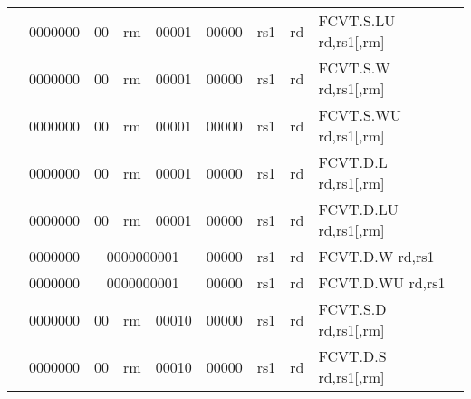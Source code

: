 \begin{table}[p]
\begin{small}
\begin{center}
\begin{tabular}{rcccccccccl}
&
\multicolumn{1}{|c|}{0000000} &
\multicolumn{1}{c|}{00} &
\multicolumn{2}{c|}{rm} &
\multicolumn{2}{c|}{00001} &
\multicolumn{1}{c|}{00000} &
\multicolumn{1}{c|}{rs1} &
\multicolumn{1}{c|}{rd} & FCVT.S.LU rd,rs1[,rm] \\
\cline{2-10}
  

&
\multicolumn{1}{|c|}{0000000} &
\multicolumn{1}{c|}{00} &
\multicolumn{2}{c|}{rm} &
\multicolumn{2}{c|}{00001} &
\multicolumn{1}{c|}{00000} &
\multicolumn{1}{c|}{rs1} &
\multicolumn{1}{c|}{rd} & FCVT.S.W rd,rs1[,rm] \\
\cline{2-10}
  

&
\multicolumn{1}{|c|}{0000000} &
\multicolumn{1}{c|}{00} &
\multicolumn{2}{c|}{rm} &
\multicolumn{2}{c|}{00001} &
\multicolumn{1}{c|}{00000} &
\multicolumn{1}{c|}{rs1} &
\multicolumn{1}{c|}{rd} & FCVT.S.WU rd,rs1[,rm] \\
\cline{2-10}
  

&
\multicolumn{1}{|c|}{0000000} &
\multicolumn{1}{c|}{00} &
\multicolumn{2}{c|}{rm} &
\multicolumn{2}{c|}{00001} &
\multicolumn{1}{c|}{00000} &
\multicolumn{1}{c|}{rs1} &
\multicolumn{1}{c|}{rd} & FCVT.D.L rd,rs1[,rm] \\
\cline{2-10}
  

&
\multicolumn{1}{|c|}{0000000} &
\multicolumn{1}{c|}{00} &
\multicolumn{2}{c|}{rm} &
\multicolumn{2}{c|}{00001} &
\multicolumn{1}{c|}{00000} &
\multicolumn{1}{c|}{rs1} &
\multicolumn{1}{c|}{rd} & FCVT.D.LU rd,rs1[,rm] \\
\cline{2-10}
  

&
\multicolumn{1}{|c|}{0000000} &
\multicolumn{5}{c|}{0000000001} &
\multicolumn{1}{c|}{00000} &
\multicolumn{1}{c|}{rs1} &
\multicolumn{1}{c|}{rd} & FCVT.D.W rd,rs1 \\
\cline{2-10}
  

&
\multicolumn{1}{|c|}{0000000} &
\multicolumn{5}{c|}{0000000001} &
\multicolumn{1}{c|}{00000} &
\multicolumn{1}{c|}{rs1} &
\multicolumn{1}{c|}{rd} & FCVT.D.WU rd,rs1 \\
\cline{2-10}
  

&
\multicolumn{1}{|c|}{0000000} &
\multicolumn{1}{c|}{00} &
\multicolumn{2}{c|}{rm} &
\multicolumn{2}{c|}{00010} &
\multicolumn{1}{c|}{00000} &
\multicolumn{1}{c|}{rs1} &
\multicolumn{1}{c|}{rd} & FCVT.S.D rd,rs1[,rm] \\
\cline{2-10}
  

&
\multicolumn{1}{|c|}{0000000} &
\multicolumn{1}{c|}{00} &
\multicolumn{2}{c|}{rm} &
\multicolumn{2}{c|}{00010} &
\multicolumn{1}{c|}{00000} &
\multicolumn{1}{c|}{rs1} &
\multicolumn{1}{c|}{rd} & FCVT.D.S rd,rs1[,rm] \\
\cline{2-10}
  


\end{tabular}
\end{center}
\end{small}
\end{table}
